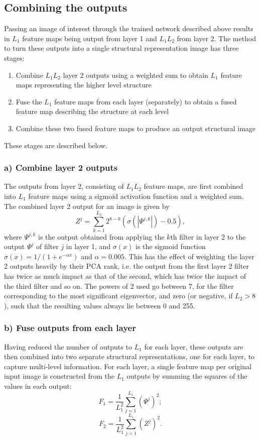\documentclass{report}
\begin{document}
\subsection{Combining the outputs}
\label{sec:featuremaps}
Passing an image of interest through the trained network described above results in $L_1$ feature maps being output from layer 1 and $L_1L_2$ from layer 2. The method to turn these outputs into a single structural representation image has three stages:
\begin{enumerate}
    \item Combine $L_1L_2$ layer 2 outputs using a weighted sum to obtain $L_1$ feature maps representing the higher level structure
    \item Fuse the $L_1$ feature maps from each layer (separately) to obtain a fused feature map describing the structure at each level
    \item Combine these two fused feature maps to produce an output structural image
\end{enumerate}
These stages are described below.
\subsubsection{a) Combine layer 2 outputs}
The outputs from layer 2, consisting of $L_1L_2$ feature maps, are first combined into $L_1$ feature maps using a sigmoid activation function and a weighted sum. The combined layer 2 output for an image is given by 
\[
Z^{j} = \sum_{k=1}^{L_2} 2^{8-k}(\sigma(|\Psi^{j,k}|)-0.5),
\]
where $\Psi^{j,k}$ is the output obtained from applying the $k$th filter in layer 2 to the output $\Psi^j$ of filter $j$ in layer 1, and $\sigma(x)$ is the sigmoid function $\sigma(x) = 1/(1+e^{-\alpha x})$ and $\alpha=0.005$. This has the effect of weighting the layer 2 outputs heavily by their PCA rank, i.e. the output from the first layer 2 filter has twice as much impact as that of the second, which has twice the impact of the third filter and so on. The powers of 2 used go between 7, for the filter corresponding to the most significant eigenvector, and zero (or negative, if $L_2>8$), such that the resulting values always lie between 0 and 255.

\subsubsection{b) Fuse outputs from each layer}
Having reduced the number of outputs to $L_1$ for each layer, these outputs are then combined into two separate structural representations, one for each layer, to capture multi-level information. For each layer, a single feature map per original input image is constructed from the $L_1$ outputs by summing the squares of the values in each output:
\[
F_1 = \frac{1}{L_1^2}\sum_{j=1}^{L_1}(\Psi^j)^2;
\]
\[
F_2 = \frac{1}{L_1^2}\sum_{j=1}^{L_1}(Z^j)^2.
\]
\end{document}
